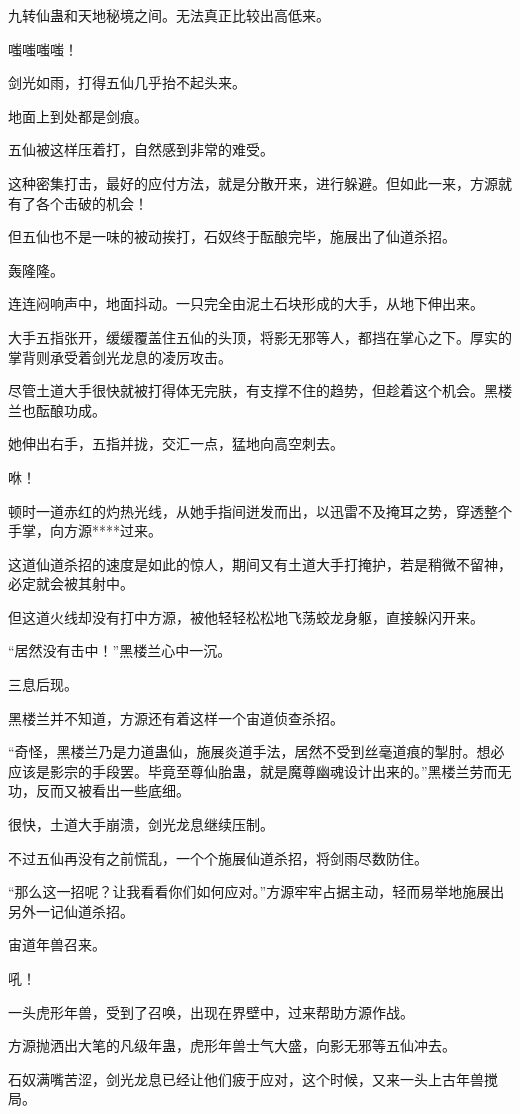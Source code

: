 \begin{this_body}
九转仙蛊和天地秘境之间。无法真正比较出高低来。

嗤嗤嗤嗤！

剑光如雨，打得五仙几乎抬不起头来。

地面上到处都是剑痕。

五仙被这样压着打，自然感到非常的难受。

这种密集打击，最好的应付方法，就是分散开来，进行躲避。但如此一来，方源就有了各个击破的机会！

但五仙也不是一味的被动挨打，石奴终于酝酿完毕，施展出了仙道杀招。

轰隆隆。

连连闷响声中，地面抖动。一只完全由泥土石块形成的大手，从地下伸出来。

大手五指张开，缓缓覆盖住五仙的头顶，将影无邪等人，都挡在掌心之下。厚实的掌背则承受着剑光龙息的凌厉攻击。

尽管土道大手很快就被打得体无完肤，有支撑不住的趋势，但趁着这个机会。黑楼兰也酝酿功成。

她伸出右手，五指并拢，交汇一点，猛地向高空刺去。

咻！

顿时一道赤红的灼热光线，从她手指间迸发而出，以迅雷不及掩耳之势，穿透整个手掌，向方源****过来。

这道仙道杀招的速度是如此的惊人，期间又有土道大手打掩护，若是稍微不留神，必定就会被其射中。

但这道火线却没有打中方源，被他轻轻松松地飞荡蛟龙身躯，直接躲闪开来。

“居然没有击中！”黑楼兰心中一沉。

三息后现。

黑楼兰并不知道，方源还有着这样一个宙道侦查杀招。

“奇怪，黑楼兰乃是力道蛊仙，施展炎道手法，居然不受到丝毫道痕的掣肘。想必应该是影宗的手段罢。毕竟至尊仙胎蛊，就是魔尊幽魂设计出来的。”黑楼兰劳而无功，反而又被看出一些底细。

很快，土道大手崩溃，剑光龙息继续压制。

不过五仙再没有之前慌乱，一个个施展仙道杀招，将剑雨尽数防住。

“那么这一招呢？让我看看你们如何应对。”方源牢牢占据主动，轻而易举地施展出另外一记仙道杀招。

宙道年兽召来。

吼！

一头虎形年兽，受到了召唤，出现在界壁中，过来帮助方源作战。

方源抛洒出大笔的凡级年蛊，虎形年兽士气大盛，向影无邪等五仙冲去。

石奴满嘴苦涩，剑光龙息已经让他们疲于应对，这个时候，又来一头上古年兽搅局。


\end{this_body}
